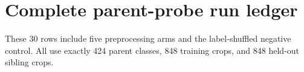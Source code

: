 \chapter{Complete parent-probe run ledger}\label{s1:ch:app02_complete_parent_probe_run_ledger}

These 30 rows include five preprocessing arms and the label-shuffled negative control. All use exactly 424 parent classes, 848 training crops, and 848 held-out sibling crops.

\begin{landscape}
\footnotesize
\setlength{\tabcolsep}{3pt}

\end{landscape}
